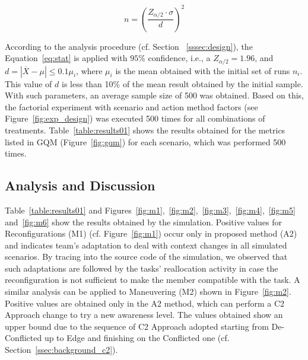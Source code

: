 \begin{equation}
    \label{eq:stat}
    n=\left(\frac{Z_{\alpha/2} \cdot \sigma}{d}\right)^2
\end{equation}

According to the analysis procedure (cf. Section ~\ref{sssec:design}), the Equation~\ref{eq:stat} is applied with $95\%$ confidence, i.e., a $Z_{\alpha/2} = 1.96$, and $d = |\overline{X} - \mu| \leq 0.1\mu_i$, where $\mu_i$ is the mean obtained with the initial set of runs $n_i$. This value of $d$ is less than 10\% of the mean result obtained by the initial sample. With such parameters, an average sample size of 500 was obtained. Based on this, the factorial experiment with scenario and action method factors (see Figure~\ref{fig:exp_design}) was executed 500 times for all combinations of treatments. Table~\ref{table:results01} shows the results obtained for the metrics listed in GQM (Figure~\ref{fig:gqm}) for each scenario, which was performed 500 times. 





\subsection{Analysis and Discussion}
\label{subsec:analysis_discussion}


Table~\ref{table:results01} and Figures~\ref{fig:m1},~\ref{fig:m2},~\ref{fig:m3},~\ref{fig:m4},~\ref{fig:m5} and~\ref{fig:m6} show the results obtained by the simulation. Positive values for Reconfigurations (M1) (cf. Figure~\ref{fig:m1}) occur only in proposed method (A2) and indicates team's adaptation to deal with context changes in \color{black}all simulated scenarios\color{black}. By tracing into the source code of the simulation, we observed that such adaptations are followed by the tasks' reallocation activity in case the reconfiguration is not sufficient to make the member compatible with the task. A similar analysis can be applied to Maneuvering (M2) shown in Figure~\ref{fig:m2}. Positive values are obtained  only in the A2 method, which can perform a C2 Approach change to try a new awareness level. The values obtained show an upper bound due to the sequence of C2 Approach adopted starting from De-Conflicted up to Edge and finishing on the Conflicted one (cf. Section~\ref{ssec:background_c2}). 

